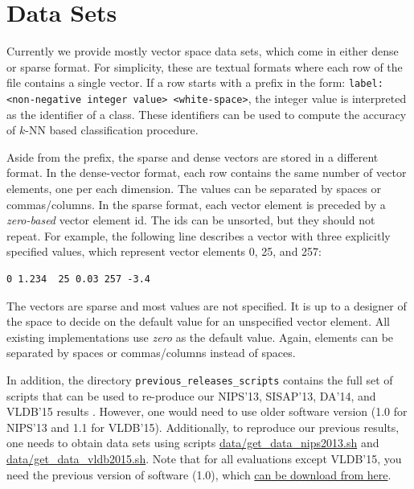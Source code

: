 \documentclass[runningheads,a4paper]{llncs}
\newcommand{\replocfile}{https://github.com/searchivarius/nmslib/blob/v1.5/}
\newcommand{\ttt}[1]{\texttt{#1}}
\newcommand{\knn}{$k$-NN }
\begin{document}
\section{Data Sets}
\label{SectionDatasets}
Currently we provide mostly vector space data sets,
which come in either dense or sparse format.
For simplicity, these are textual formats where each row of the file contains a single vector.
If a row starts with a prefix in the form: \ttt{label:<non-negative integer value> <white-space>},
the integer value is interpreted as the identifier of a class.
These identifiers can be used to compute the accuracy of \knn based classification procedure.

Aside from the prefix, the sparse and dense vectors are stored in a different format.
In the dense-vector format, each row
contains the same number of vector elements, one per each dimension.
The values can be separated by spaces or commas/columns.
In the sparse format, each vector element is preceded
by a \emph{zero-based} vector element id. 
The ids can be unsorted, but they should not repeat.
For example, the following line
describes a vector with three explicitly specified values,
which represent vector elements 0, 25, and 257:
\begin{verbatim}
0 1.234  25 0.03 257 -3.4 
\end{verbatim}

The vectors are sparse and most values are not specified.
It is up to a designer of the space to decide on the default value for an unspecified vector element.
All existing implementations use \emph{zero} as the default value.
Again, elements can be separated by spaces or commas/columns instead of spaces.

In addition, the directory \ttt{previous\_releases\_scripts} contains the full set of scripts that can be used to re-produce our NIPS'13, SISAP'13, DA'14, and VLDB'15 results \cite{Boytsov_and_Bilegsaikhan:sisap2013,Boytsov_and_Bilegsaikhan:nips2013,ponomarenko2014comparative,naidan2015permutation}.
However, one would need to use older software version (1.0 for NIPS'13 and 1.1 for VLDB'15).
Additionally, to reproduce our previous results, one needs to obtain data sets using scripts
\href{\replocfile data/get_data_nips2013.sh}{data/get\_data\_nips2013.sh} 
and \href{\replocfile data/get_data_vldb2015.sh}{data/get\_data\_vldb2015.sh}. 
Note that for all evaluations except VLDB'15, you need the previous version of software (1.0),
which \href{https://github.com/searchivarius/NonMetricSpaceLib/releases}{can be download from here}.
\end{document}
